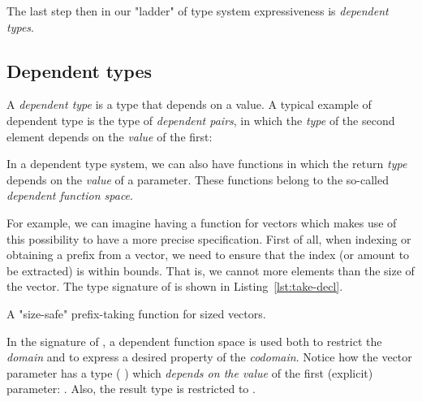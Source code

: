             The last step then in our "ladder" of type system expressiveness is \emph{dependent types}.

        \subsection{Dependent types}
        \label{subsec:dependent-types}

            A \emph{dependent type} is a type that depends on a value.
            A typical example of dependent type is the type of \emph{dependent pairs},
            in which the \emph{type} of the second element depends on the \emph{value} of the first:

            \begin{center}
            \end{center}

            In a dependent type system, we can also have functions in which the return \emph{type}
            depends on the \emph{value} of a parameter.
            These functions belong to the so-called \emph{dependent function space}.

            For example, we can imagine having a  function for vectors which makes use
            of this possibility to have a more precise specification.
            First of all, when indexing or obtaining a prefix from a vector,
            we need to ensure that the index (or amount to be extracted) is within bounds.
            That is, we cannot  more elements than the size of the vector.
            The type signature of  is shown in Listing~\ref{lst:take-decl}.

            \begin{listing}[h]
                \caption{A "size-safe" prefix-taking function for sized vectors. \label{lst:take-decl}}
            \end{listing}

            In the signature of , a dependent function space is used both
            to restrict the \emph{domain} and to express a desired property of the \emph{codomain}.
            Notice how the vector parameter has a type (  \AY{(} \AF{+} \AY{)})
            which \emph{depends on the value} of the first (explicit) parameter: .
            Also, the result type is restricted to   .

